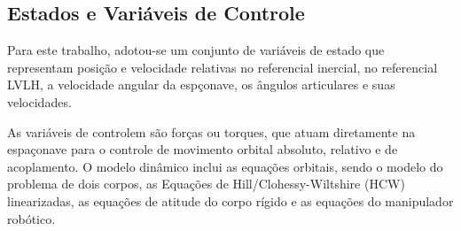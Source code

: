 \subsection{Estados e Variáveis de Controle}
\label{sec:var_estado_controle}

Para este trabalho, adotou-se um conjunto de variáveis de estado que representam posição e velocidade relativas no referencial inercial, no referencial LVLH, a velocidade angular da espçonave, os ângulos articulares e suas velocidades.

As variáveis de controlem são forças ou torques, que atuam diretamente na espaçonave para o controle de movimento orbital absoluto, relativo e de acoplamento.
O modelo dinâmico inclui as equações orbitais, sendo o modelo do problema de dois corpos, as Equações de Hill/Clohessy-Wiltshire (HCW) linearizadas, as equações de atitude do corpo rígido e as equações do manipulador robótico. 

